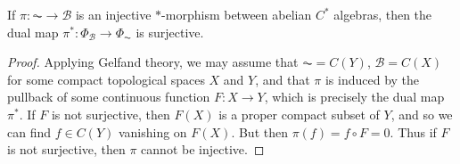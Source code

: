 \begin{lemma}
    If $\pi: \AC \to \mathcal{B}$ is an injective $*$-morphism between abelian $C^*$ algebras, then the dual map $\pi^*: \Phi_{\mathcal{B}} \to \Phi_{\AC}$ is surjective.
\end{lemma}
\begin{proof}
    Applying Gelfand theory, we may assume that $\AC = C(Y)$, $\mathcal{B} = C(X)$ for some compact topological spaces $X$ and $Y$, and that $\pi$ is induced by the pullback of some continuous function $F: X \to Y$, which is precisely the dual map $\pi^*$. If $F$ is not surjective, then $F(X)$ is a proper compact subset of $Y$, and so we can find $f \in C(Y)$ vanishing on $F(X)$. But then $\pi(f) = f \circ F = 0$. Thus if $F$ is not surjective, then $\pi$ cannot be injective.
\end{proof}

\begin{comment}

\begin{prop}
    An injective, continuous morphism $\pi: \AC \to \mathcal{B}$ from a $C^*$ algebra to a Banach algebra satisfies
    \[ \| M \| \leq \| \pi \| \| \pi(M) \| \]
    for all $M \in \AC$.
\end{prop}
\begin{proof}
    Given $M \in \AC$, let $\AC_0 = C^*(M^*M)$. Define a norm on $\AC_0$ by letting
    \[ \vvvert N \vvvert = \| \pi(N) \| \]
    Then $\| \cdot \| \leq \vvvert \cdot \vvvert$, since $\vvvert \cdot \vvvert$ is multiplicative, and $\AC_0$ is isomorphic to $C(X)$ for some compact topological space $X$. Thus we conclude that
    \[ \| M \|^2 = \| M^*M \| \leq \vvvert M^*M \vvvert = \| \pi(M^*M) \| \leq \| \pi \| \| M \| \| \pi(M) \|, \]
    which yields the claim.
\end{proof}

\begin{corollary}
    Let $\pi: \AC \to \mathcal{B}$ be a $*$ homomorphism between $C^*$ algebras. Then $\pi(\AC)$ is a closed $C^*$ algebra, and $\pi$ is an isometry if it is injective.
\end{corollary}
\begin{proof}
    If $\pi$ is injective, it certainly has closed range by the last proposition. But in general, letting $\IA = \ker(\pi)$, $\pi$ induces an injective map
    \begin{center}
    \begin{tikzcd}
        \AC \arrow{r}{\pi} \arrow{d}{} & \mathcal{B} \\
        \AC/\IA \arrow{ru}{\tilde{\pi}}
    \end{tikzcd}
    \end{center}
    and $\pi(\AC) = \tilde{\pi}(\AC)$ is closed. Thus if $\pi$ is injective we obtain an inverse $*$ homomorphism $\pi^{-1}: \pi(\AC) \to \AC$, and both must be contractible, hence isometries.
\end{proof}

\end{comment}

